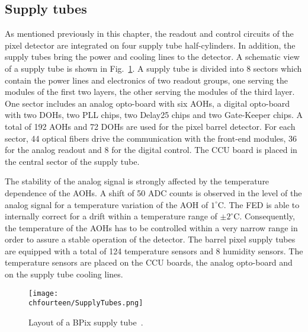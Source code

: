 \subsection{Supply tubes}

As mentioned previously in this chapter, the readout and control circuits of the pixel detector are integrated on four supply tube half-cylinders.
In addition, the supply tubes bring the power and cooling lines to the detector.
A schematic view of a supply tube is shown in Fig.~\ref{fig:SupplyTubes}.
A supply tube is divided into 8 sectors which contain the power lines and electronics of two readout groups, one serving the modules of the first two layers, the other serving the modules of the third layer.
One sector includes an analog opto-board with six AOHs, a digital opto-board with two DOHs, two PLL chips, two Delay25 chips and two Gate-Keeper chips.
A total of 192 AOHs and 72 DOHs are used for the pixel barrel detector. For each sector, 44 optical fibers drive the communication with the front-end modules, 36 for the analog readout and 8 for the digital control. 
The CCU board is placed in the central sector of the supply tube.
  
 The stability of the analog signal is strongly affected by the temperature dependence of the AOHs.
A shift of 50 ADC counts is observed in the level of the analog signal for a temperature variation of the AOH of $1^\circ$\unit{C}.
The FED is able to internally correct for a drift within a temperature range of $\pm2^\circ$\unit{C}.
Consequently, the temperature of the AOHs has to be controlled within a very narrow range in order to assure a stable operation of the detector.
The barrel pixel supply tubes are equipped with a total of 124 temperature sensors and 8 humidity sensors.
The temperature sensors are placed on the CCU boards, the analog opto-board and on the supply tube cooling lines.

\begin{figure}[!htb]
 \begin{center}
 \texttt{[image: \\chfourteen/SupplyTubes.png]}
 \end{center}
 \caption{Layout of a BPix supply tube~\cite{Kastli2007724}.}
 \label{fig:SupplyTubes}
\end{figure}


